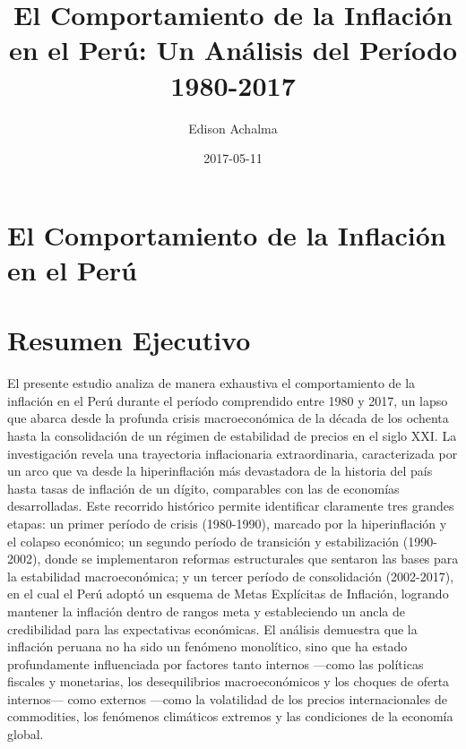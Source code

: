 \documentclass[
  stu,
  floatsintext,
  longtable,
  a4paper,
  nolmodern,
  notxfonts,
  notimes,
  12pt,
  colorlinks=true,linkcolor=blue,citecolor=blue,urlcolor=blue]{apa7}
\title{El Comportamiento de la Inflación en el Perú: Un Análisis del
Período 1980-2017}
\author{Edison Achalma}
\affiliation{
{Escuela Profesional de Economía, Universidad Nacional de San Cristóbal
de Huamanga}}
\date{2017-05-11}
\begin{document}
\maketitle


\hypertarget{toc}{}
\tableofcontents
\newpage
\section[Introduction]{El Comportamiento de la Inflación en el Perú}

\setcounter{secnumdepth}{3}

\setlength\LTleft{0pt}




\section{Resumen Ejecutivo}\label{resumen-ejecutivo}

El presente estudio analiza de manera exhaustiva el comportamiento de la
inflación en el Perú durante el período comprendido entre 1980 y 2017,
un lapso que abarca desde la profunda crisis macroeconómica de la década
de los ochenta hasta la consolidación de un régimen de estabilidad de
precios en el siglo XXI. La investigación revela una trayectoria
inflacionaria extraordinaria, caracterizada por un arco que va desde la
hiperinflación más devastadora de la historia del país hasta tasas de
inflación de un dígito, comparables con las de economías desarrolladas.
Este recorrido histórico permite identificar claramente tres grandes
etapas: un primer período de crisis (1980-1990), marcado por la
hiperinflación y el colapso económico; un segundo período de transición
y estabilización (1990-2002), donde se implementaron reformas
estructurales que sentaron las bases para la estabilidad macroeconómica;
y un tercer período de consolidación (2002-2017), en el cual el Perú
adoptó un esquema de Metas Explícitas de Inflación, logrando mantener la
inflación dentro de rangos meta y estableciendo un ancla de credibilidad
para las expectativas económicas. El análisis demuestra que la inflación
peruana no ha sido un fenómeno monolítico, sino que ha estado
profundamente influenciada por factores tanto internos ---como las
políticas fiscales y monetarias, los desequilibrios macroeconómicos y
los choques de oferta internos--- como externos ---como la volatilidad
de los precios internacionales de commodities, los fenómenos climáticos
extremos y las condiciones de la economía global.
\end{document}

